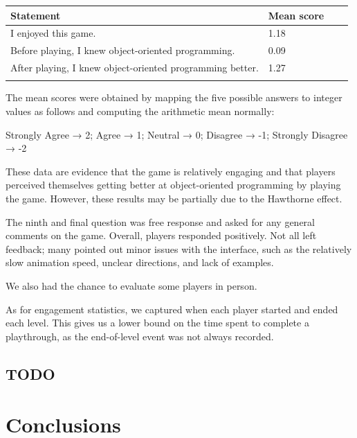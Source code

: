 \documentclass[12pt,notitlepage]{article}
\begin{document}
\begin{tabu}{Xlll}
\toprule
Statement & Mean score \\
\midrule
I enjoyed this game. & 1.18 \\
Before playing, I knew object-oriented programming. & 0.09 \\
After playing, I knew object-oriented programming better. & 1.27\\
\bottomrule
\\
\end{tabu}

The mean scores were obtained by mapping the five possible answers to integer
values as follows and computing the arithmetic mean normally:\\
\centerline{Strongly Agree → 2; Agree → 1; Neutral → 0; Disagree → -1; Strongly Disagree → -2}

These data are evidence that the game is relatively engaging and that players
perceived themselves getting better at object-oriented programming by playing
the game. However, these results may be partially due to the Hawthorne effect.

The ninth and final question was free response and asked for any general
comments on the game. Overall, players responded positively. Not all left
feedback; many pointed out minor issues with the interface, such as the
relatively slow animation speed, unclear directions, and lack of examples.

We also had the chance to evaluate some players in person.

As for engagement statistics, we captured when each player started and
ended each level. This gives us a lower bound on the time spent to
complete a playthrough, as the end-of-level event was not always
recorded.

\subsection{TODO}

\section{Conclusions}
\end{document}
